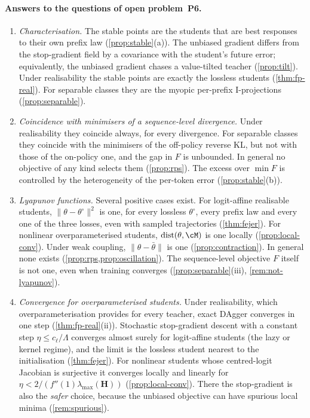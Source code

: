 \paragraph{Answers to the questions of open problem~P6.}
\begin{enumerate}[leftmargin=*,label=(\arabic*),nosep]
\item \emph{Characterisation.} The stable points are the students that are best responses to their own prefix law
(\cref{prop:stable}(a)). The unbiased gradient differs from the stop-gradient field by a covariance with the student's
future error; equivalently, the unbiased gradient chases a value-tilted teacher (\cref{prop:tilt}). Under realisability the stable
points are exactly the lossless students (\cref{thm:fp-real}). For separable classes they are the myopic per-prefix
I-projections (\cref{prop:separable}).
\item \emph{Coincidence with minimisers of a sequence-level divergence.} Under realisability they coincide always, for every divergence. For separable classes they
coincide with the minimisers of the off-policy reverse KL, but not with those of the on-policy one, and the gap in
$F$ is unbounded. In general no objective of any kind selects them (\cref{prop:rps}). The excess over $\min F$ is controlled by
the heterogeneity of the per-token error (\cref{prop:stable}(b)).
\item \emph{Lyapunov functions.} Several positive cases exist. For logit-affine realisable students, $\|\theta-\theta^\circ\|^2$ is one, for every lossless $\theta^\circ$, every
prefix law and every one of the three losses, even with sampled trajectories (\cref{thm:fejer}). For nonlinear overparameterised
students, $\operatorname{dist}(\theta,\cM)$ is one locally (\cref{prop:local-conv}). Under weak coupling, $\|\theta-\bar\theta\|$ is one (\cref{prop:contraction}). In
general none exists (\cref{prop:rps,prop:oscillation}). The sequence-level objective $F$ itself is not one, even when training converges
(\cref{prop:separable}(iii), \cref{rem:not-lyapunov}).
\item \emph{Convergence for overparameterised students.} Under realisability, which overparameterisation provides for every
teacher, exact DAgger converges in one step (\cref{thm:fp-real}(ii)). Stochastic stop-gradient descent with a constant step
$\eta\le c_\ell/\Lambda$ converges almost surely for logit-affine students (the lazy or kernel regime), and the limit is the lossless student
nearest to the initialisation (\cref{thm:fejer}). For nonlinear students whose centred-logit Jacobian is surjective it converges
locally and linearly for $\eta<2/(f''(1)\lambda_{\max}(\mathbf H))$ (\cref{prop:local-conv}). There the stop-gradient is also the \emph{safer} choice, because the
unbiased objective can have spurious local minima (\cref{rem:spurious}).
\end{enumerate}

